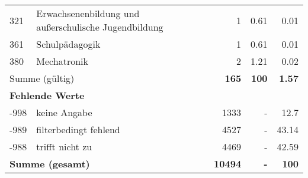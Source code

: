 \begin{longtable}{lXrrr}
        321 & \multicolumn{1}{X}{Erwachsenenbildung und außerschulische Jugendbildung} & %
          \num{1} &
          \num[round-mode=places,round-precision=2]{0.61} &
          \num[round-mode=places,round-precision=2]{0.01} \\

        361 & \multicolumn{1}{X}{Schulpädagogik} & %
          \num{1} &
          \num[round-mode=places,round-precision=2]{0.61} &
          \num[round-mode=places,round-precision=2]{0.01} \\

        380 & \multicolumn{1}{X}{Mechatronik} & %
          \num{2} &
          \num[round-mode=places,round-precision=2]{1.21} &
          \num[round-mode=places,round-precision=2]{0.02} \\

     \midrule
     \multicolumn{2}{l}{Summe (gültig)} &
       \textbf{\num{165}} &
     \textbf{\num{100}} &
       \textbf{\num[round-mode=places,round-precision=2]{1.57}} \\
     \multicolumn{5}{l}{\textbf{Fehlende Werte}}\\
       -998 &
       keine Angabe &
         \num{1333} &
        - &
         \num[round-mode=places,round-precision=2]{12.7} \\
       -989 &
       filterbedingt fehlend &
         \num{4527} &
        - &
         \num[round-mode=places,round-precision=2]{43.14} \\
       -988 &
       trifft nicht zu &
         \num{4469} &
        - &
         \num[round-mode=places,round-precision=2]{42.59} \\
     \midrule
     \multicolumn{2}{l}{\textbf{Summe (gesamt)}} &
          \textbf{\num{10494}} &
        \textbf{-} &
        \textbf{\num{100}} \\
     \bottomrule
     \end{longtable}
     
